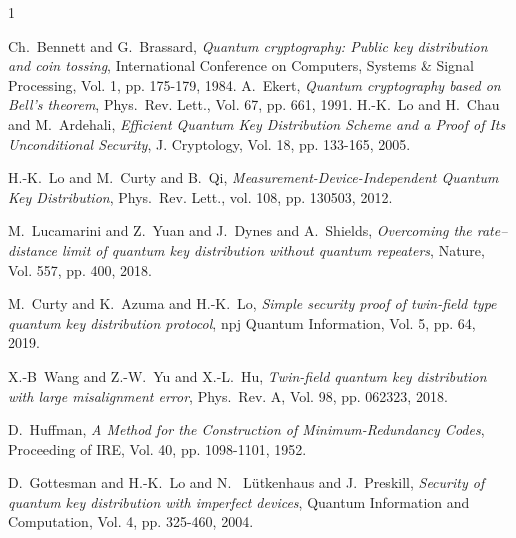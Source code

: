 \documentclass[journal,onecolumn]{IEEEtran}
\theoremstyle{thmstyleone}%
\theoremstyle{thmstyletwo}%
\theoremstyle{thmstylethree}%
\begin{document}
	
	\begin{thebibliography}{1}
		
			Ch.~Bennett and  G.~Brassard, \emph{Quantum cryptography: Public key distribution and coin tossing}, International Conference on Computers, Systems \& Signal Processing, Vol. 1,
			pp. 175-179, 1984.
			A.~Ekert, \emph{Quantum cryptography based on Bell’s theorem}, Phys.\ Rev. Lett., Vol. 67, pp. 661, 1991.
			H.-K.~Lo and H.~Chau and M.~Ardehali, \emph{Efficient Quantum Key Distribution Scheme and a Proof of Its Unconditional Security}, J. Cryptology, Vol. 18, pp. 133-165, 2005.
		
			H.-K.~Lo and M.~Curty and B.~Qi,
			\emph{Measurement-Device-Independent Quantum Key Distribution}, Phys.\ Rev. Lett., vol. 108, pp. 130503, 2012.
		
			M.~Lucamarini and  Z.~Yuan and  J.~Dynes and  A.~Shields, \emph{Overcoming the rate–distance limit of quantum key distribution without quantum repeaters},
			Nature, Vol. 557, pp. 400, 2018.
		
		
		M.~Curty and K.~Azuma  and  H.-K.~Lo, 
		\emph{Simple  security  proof  of  twin-ﬁeld  type  quantum  key distribution  protocol}, npj Quantum Information, Vol. 5, pp. 64, 2019.
		
			X.-B~Wang and  Z.-W.~Yu and X.-L.~Hu, 
			\emph{Twin-ﬁeld quantum key distribution with large misalignment error}, Phys.\ Rev. A, Vol. 98, pp. 062323, 2018.
		
		D.~Huffman, \emph{A Method for the Construction of Minimum-Redundancy Codes}, Proceeding of IRE, Vol. 40, pp. 1098-1101, 1952.
		
		D.~Gottesman and H.-K.~Lo and N.~ L{\"u}tkenhaus and J.~Preskill, 
		\emph{Security of quantum key distribution with imperfect devices}, Quantum Information and Computation, Vol. 4, pp. 325-460, 2004.
		

\end{thebibliography}
\end{document}
